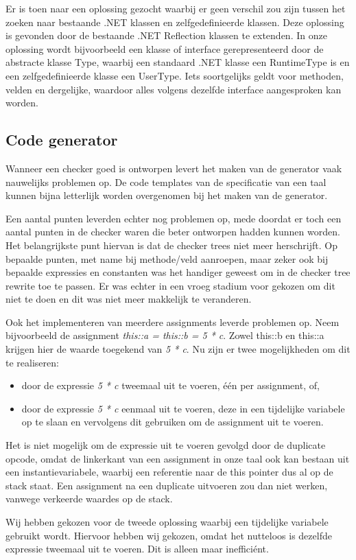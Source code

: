 Er is toen naar een oplossing gezocht waarbij er geen verschil zou zijn tussen het zoeken naar bestaande .NET klassen en zelfgedefinieerde klassen. Deze oplossing is gevonden door de bestaande .NET Reflection klassen te extenden. In onze oplossing wordt bijvoorbeeld een klasse of interface gerepresenteerd door de abstracte klasse Type, waarbij een standaard .NET klasse een RuntimeType is en een zelfgedefinieerde klasse een UserType. Iets soortgelijks geldt voor methoden, velden en dergelijke, waardoor alles volgens dezelfde interface aangesproken kan worden.

\subsection{Code generator}
Wanneer een checker goed is ontworpen levert het maken van de generator vaak nauwelijks problemen op. De code templates van de specificatie van een taal kunnen bijna letterlijk worden overgenomen bij het maken van de generator.

Een aantal punten leverden echter nog problemen op, mede doordat er toch een aantal punten in de checker waren die beter ontworpen hadden kunnen worden. Het belangrijkste punt hiervan is dat de checker trees niet meer herschrijft. Op bepaalde punten, met name bij methode/veld aanroepen, maar zeker ook bij bepaalde expressies en constanten was het handiger geweest om in de checker tree rewrite toe te passen. Er was echter in een vroeg stadium voor gekozen om dit niet te doen en dit was niet meer makkelijk te veranderen.

Ook het implementeren van meerdere assignments leverde problemen op. Neem bijvoorbeeld de assignment \emph{this::a = this::b = 5 * c}. Zowel this::b en this::a krijgen hier de waarde toegekend van \emph{5 * c}. Nu zijn er twee mogelijkheden om dit te realiseren:
\begin{itemize}
	\item door de expressie \emph{5 * c} tweemaal uit te voeren, \'e\'en per assignment, of,
	\item door de expressie \emph{5 * c} eenmaal uit te voeren, deze in een tijdelijke variabele op te slaan en vervolgens dit gebruiken om de assignment uit te voeren.
\end{itemize}
Het is niet mogelijk om de expressie uit te voeren gevolgd door de duplicate opcode, omdat de linkerkant van een assignment in onze taal ook kan bestaan uit een instantievariabele, waarbij een referentie naar de this pointer dus al op de stack staat. Een assignment na een duplicate uitvoeren zou dan niet werken, vanwege verkeerde waardes op de stack.

Wij hebben gekozen voor de tweede oplossing waarbij een tijdelijke variabele gebruikt wordt. Hiervoor hebben wij gekozen, omdat het nutteloos is dezelfde expressie tweemaal uit te voeren. Dit is alleen maar ineffici\'ent.